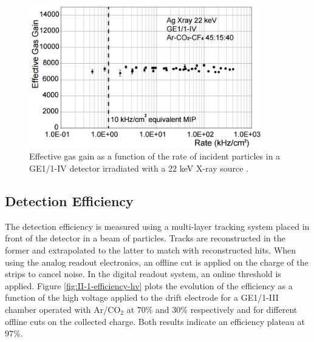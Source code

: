       \begin{figure}[h!]
        \centering
        \includegraphics[width=0.9\textwidth]{img/II-1-gem/rate.png}
        \caption{Effective gas gain as a function of the rate of incident particles in a GE1/1-IV detector irradiated with a 22 keV X-ray source \cite{Colaleo:2021453}.}
        \label{fig:II-1-rate-mes}
      \end{figure}

    \subsection{Detection Efficiency}

      The detection efficiency is measured using a multi-layer tracking system placed in front of the detector in a beam of particles. Tracks are reconstructed in the former and extrapolated to the latter to match with reconstructed hits. When using the analog readout electronics, an offline cut is applied on the charge of the strips to cancel noise. In the digital readout system, an online threshold is applied. Figure \ref{fig:II-1-efficiency-hv} plots the evolution of the efficiency as a function of the high voltage applied to the drift electrode for a GE1/1-III chamber operated with Ar/CO$_2$ at 70\% and 30\% respectively and for different offline cuts on the collected charge. Both results indicate an efficiency plateau at 97\%. \\

